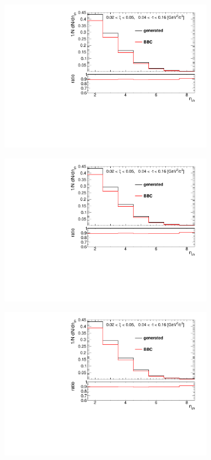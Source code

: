 \begin{figure}[t!]
	\centering
	\begin{subfigure}{.45\textwidth}
		\includegraphics[width=\textwidth,page=4]{chapters/chrgSTAR/img/bbcCorrection/xi_bbc.pdf}
	\end{subfigure}
	\begin{subfigure}{.45\textwidth}
		\includegraphics[width=\textwidth,page=8]{chapters/chrgSTAR/img/bbcCorrection/xi_bbc.pdf}
	\end{subfigure}
	\begin{subfigure}{.45\textwidth}
		\includegraphics[width=\textwidth,page=12]{chapters/chrgSTAR/img/bbcCorrection/xi_bbc.pdf}

\end{subfigure}
\end{figure}
